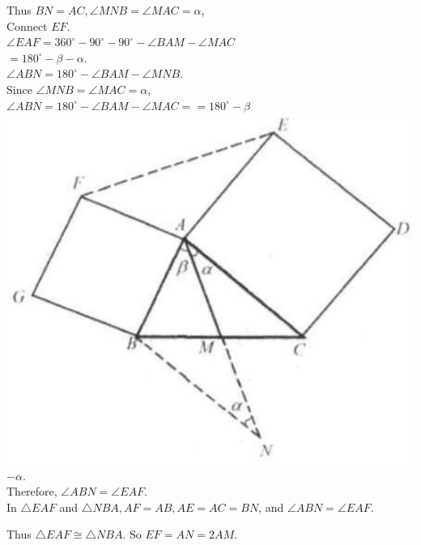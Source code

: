 \documentclass{article}
\begin{document}
Thus \(B N=A C, \angle M N B=\angle M A C=\alpha\),\\
Connect \(E F\).\\
\(\angle E A F=360^{\circ}-90^{\circ}-90^{\circ}-\angle B A M-\angle M A C\)\\
\(=180^{\circ}-\beta-\alpha\).\\
\(\angle A B N=180^{\circ}-\angle B A M-\angle M N B\).\\
Since \(\angle M N B=\angle M A C=\alpha\),\\
\(\angle A B N=180^{\circ}-\angle B A M-\angle M A C==180^{\circ}-\beta\)\\
\centering
\includegraphics[width=\textwidth]{images/025.jpg}\\
\(-\alpha\).\\
Therefore, \(\angle A B N=\angle E A F\).\\
In \(\triangle E A F\) and \(\triangle N B A, A F=A B, A E=A C=B N\), and \(\angle A B N=\angle E A F\).

Thus \(\triangle E A F \cong \triangle N B A\). So \(E F=A N=2 A M\).
\end{document}
